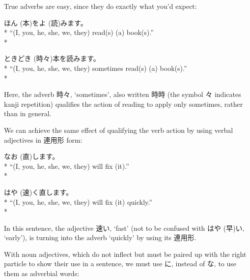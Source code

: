 \documentclass[11pt, b5paper, twoside, openright, onecolumn]{book}
\makeatletter
\newcommand*{\rubystack}[2]{{\relscale{0.5}%
  \begin{tabular}[b]{@{}c@{}}%
    {#1}\\%
   {\textscale{2}{#2}}%
  \end{tabular}}%
}
\DeclareRobustCommand*{\ruby}[2]{%
  \mbox{%
    \setlength{\parskip}{0ex}%
    \BeginAccSupp{method=pdfstringdef,ActualText={#1}}%
      \rubystack{\phantom{#2}}{#1}%
      \llap{%
        \rubystack{#2}{\phantom{#1}}%
      }%
    \EndAccSupp{}%
  }%
}
\renewcommand*{\ruby}[2]{#2 (#1)}%
\newenvironment{exampleblock}{
\setlength{\parindent}{0.6in}
\begin{minipage}[t]{\dimexpr\textwidth-\parindent}}
{\end{minipage}}
\makeatother
\begin{document}
True adverbs are easy‚ since they do exactly what you’d expect:

\vspace{0.4cm}
\begin{exampleblock}
\ruby{本}{ほん}を\ruby{読}{よ}みます。 \\* 
“(I‚ you‚ he‚ she‚ we‚ they) read(s) (a) book(s).” \\* 
\end{exampleblock}
\vspace{0.2cm}

\begin{exampleblock}
\ruby{時々}{ときどき}本を読みます。 \\* 
“(I‚ you‚ he‚ she‚ we‚ they) sometimes read(s) (a) book(s).” \\* 
\end{exampleblock}
\vspace{0.2cm}

Here‚ the adverb 時々‚ ‘sometimes’‚ also written 時時 (the symbol 々 indicates kanji repetition) qualifies the action of reading to apply only sometimes‚ rather than in general.

We can achieve the same effect of qualifying the verb action by using verbal adjectives in 連用形 form:

\vspace{0.4cm}
\begin{exampleblock}
\ruby{直}{なお}します。 \\* 
“(I‚ you‚ he‚ she‚ we‚ they) will fix (it).” \\* 
\end{exampleblock}
\vspace{0.2cm}

\begin{exampleblock}
\ruby{速}{はや}く直します。 \\* 
“(I‚ you‚ he‚ she‚ we‚ they) will fix (it) quickly.” \\* 
\end{exampleblock}
\vspace{0.2cm}

In this sentence‚ the adjective 速い‚ ‘fast’ (not to be confused with \ruby{早}{はや}い‚ ‘early’)‚ is turning into the adverb ‘quickly’ by using its 連用形.

With noun adjectives‚ which do not inflect but must be paired up with the right particle to show their use in a sentence‚ we must use に‚ instead of な‚ to use them as adverbial words:
\end{document}
